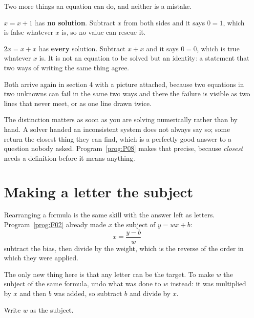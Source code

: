 \begin{fr}
Two more things an equation can do, and neither is a mistake.

$x = x + 1$ has \textbf{no solution}. Subtract $x$ from both sides and it says
$0 = 1$, which is false whatever $x$ is, so no value can rescue it.

$2x = x + x$ has \textbf{every} solution. Subtract $x + x$ and it says
$0 = 0$, which is true whatever $x$ is. It is not an equation to be solved but
an identity: a statement that two ways of writing the same thing agree.

Both arrive again in section 4 with a picture attached, because two equations
in two unknowns can fail in the same two ways and there the failure is visible
as two lines that never meet, or as one line drawn twice.

\begin{note}
The distinction matters as soon as you are solving numerically rather than by
hand. A solver handed an inconsistent system does not always say so; some
return the closest thing they can find, which is a perfectly good answer to a
question nobody asked. Program~\ref{prog:P08} makes that precise, because
\emph{closest} needs a definition before it means anything.
\end{note}
\end{fr}

\section{Making a letter the subject}
\label{sec:F06-subject}

\begin{fr}
Rearranging a formula is the same skill with the answer left as letters.
Program~\ref{prog:F02} already made $x$ the subject of $y = wx + b$:
\[ x = \frac{y - b}{w} \]
subtract the bias, then divide by the weight, which is the reverse of the
order in which they were applied.

The only new thing here is that any letter can be the target. To make $w$ the
subject of the same formula, undo what was done to $w$ instead: it was
multiplied by $x$ and then $b$ was added, so subtract $b$ and divide by $x$.

Write $w$ as the subject.
\nextframe
\end{fr}

